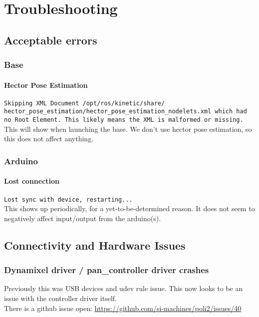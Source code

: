 \chapter{Troubleshooting}\label{ch:troubleshooting}

\section{Acceptable errors}

\subsection{Base}
\subsubsection{Hector Pose Estimation}
\texttt{Skipping XML Document /opt/ros/kinetic/share/\\
hector\_pose\_estimation/hector\_pose\_estimation\_nodelets.xml which had no Root Element.  This likely means the XML is malformed or missing.} \\

This will show when launching the base. We don't use hector pose estimation, so this does not affect anything.

\subsection{Arduino}
\subsubsection{Lost connection}
\texttt{Lost sync with device, restarting...} \\

This shows up periodically, for a yet-to-be-determined reason. It does not seem to negatively affect input/output from the arduino(s).

\section{Connectivity and Hardware Issues}
\subsection{Dynamixel driver / pan\_controller driver crashes}
Previously this was USB devices and udev rule issue. 
This now looks to be an issue with the controller driver itself. \\
There is a github issue open: \href{https://github.com/si-machines/poli2/issues/40}{https://github.com/si-machines/poli2/issues/40}


